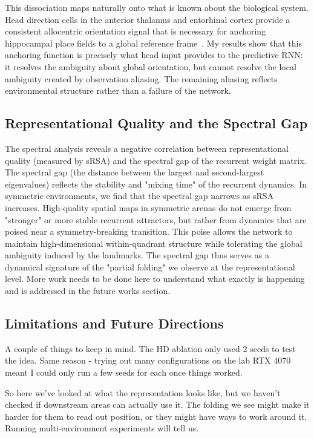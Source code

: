 ﻿\documentclass[11pt, a4paper]{article}
\begin{document}
This dissociation maps naturally onto what is known about the biological
system. Head direction cells in the anterior thalamus and entorhinal cortex
provide a consistent allocentric orientation signal that is
necessary for anchoring hippocampal place fields to a global reference
frame~\citep{lever2002}. My results show that this anchoring function
is precisely what head input provides to the predictive RNN: it resolves
the ambiguity about global orientation, but cannot resolve the local
ambiguity created by observation aliasing. The remaining
aliasing reflects environmental structure rather than a failure of the
network.

\subsection{Representational Quality and the Spectral Gap}

The spectral analysis reveals a negative correlation between representational quality (measured by sRSA) and the spectral gap of the recurrent weight matrix. The spectral gap (the distance between the largest and second-largest eigenvalues) reflects the stability and "mixing time" of the recurrent dynamics. In symmetric environments, we find that the spectral gap narrows as sRSA increases. High-quality spatial maps in symmetric arenas do not emerge from "stronger" or more stable recurrent attractors, but rather from dynamics that are poised near a symmetry-breaking transition. This poise allows the network to maintain high-dimensional within-quadrant structure while tolerating the global ambiguity induced by the landmarks. The spectral gap thus serves as a dynamical signature of the "partial folding" we observe at the representational level. More work needs to be done here to understand what exactly is happening and is addressed in the future works section. 

\subsection{Limitations and Future Directions}

A couple of things to keep in mind. The HD ablation only used 2 seeds to test the idea. Same reason - trying out many configurations on the lab RTX 4070 meant I could only run a few seeds for each once things worked.

So here we've looked at what the representation looks like, but we haven't checked if downstream areas can actually use it. The folding we see might make it harder for them to read out position, or they might have ways to work around it. Running multi-environment experiments will tell us.
\end{document}
